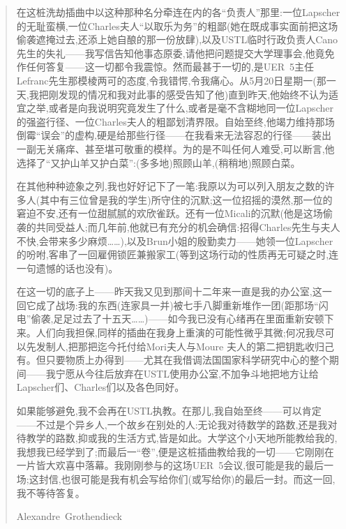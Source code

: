 \begin{quote}
在这桩洗劫插曲中以这种那种名分牵连在内的各“负责人”那里:一位Lapscher的无耻蛮横,一位Charles夫人“以取乐为务”的粗鄙(她在既成事实面前把这场偷袭遮掩过去,还添上她自酿的那一份放肆),以及USTL临时行政负责人Cano先生的失礼——我写信告知他事态原委,请他把问题提交大学理事会,他竟免作任何答复——这一切都令我震惊。然而最甚于一切的,是UER~5主任Lefranc先生那模棱两可的态度,令我错愕,令我痛心。从5月20日星期一(那一天,我把刚发现的情况和我对此事的感受告知了他)直到昨天,他始终不认为适宜之举,或者是向我说明究竟发生了什么,或者是毫不含糊地同一位Lapscher的强盗行径、一位Charles夫人的粗鄙划清界限。自始至终,他竭力维持那场倒霉“误会”的虚构,硬是给那些行径——在我看来无法容忍的行径——装出一副无关痛痒、甚至堪可敬重的模样。为的是不叫任何人难受,可以断言,他选择了“又护山羊又护白菜”:(多多地)照顾山羊,(稍稍地)照顾白菜。

在其他种种迹象之列,我也好好记下了一笔:我原以为可以列入朋友之数的许多人(其中有三位曾是我的学生)所守住的沉默;这一位招摇的漠然,那一位的窘迫不安,还有一位甜腻腻的欢欣雀跃。还有一位Micali的沉默(他是这场偷袭的共同受益人;而几年前,他就已有充分的机会确信:招得Charles先生与夫人不快,会带来多少麻烦……),以及Brun小姐的殷勤卖力——她领一位Lapscher的吩咐,客串了一回雇佣锁匠兼搬家工(等到这场行动的性质再无可疑之时,连一句遗憾的话也没有)。

在这一切的底子上——昨天我又见到那间十二年来一直是我的办公室,这一回它成了战场:我的东西(连家具一并)被七手八脚重新堆作一团(距那场“闪电”偷袭,足足过去了十五天……)——如今我已没有心绪再在里面重新安顿下来。人们向我担保,同样的插曲在我身上重演的可能性微乎其微;何况我尽可以先发制人,把那把迄今托付给Mori夫人与Moure 夫人的第二把钥匙收归己有。但只要物质上办得到——尤其在我借调法国国家科学研究中心的整个期间——我宁愿从今往后放弃在USTL使用办公室,不加争斗地把地方让给Lapscher们、Charles们以及各色同好。

如果能够避免,我不会再在USTL执教。在那儿,我自始至终——可以肯定——不过是个异乡人,一个故乡在别处的人:无论我对待数学的路数,还是我对待教学的路数,抑或我的生活方式,皆是如此。大学这个小天地所能教给我的,我想我已经学到了;而最后一“卷”,便是这桩插曲教给我的一切——它刚刚在一片皆大欢喜中落幕。我刚刚参与的这场UER~5会议,很可能是我的最后一场;这封信,也很可能是我有机会写给你们(或写给你)的最后一封。而这一回,我不等待答复。

\hfill Alexandre~Grothendieck
\end{quote}
